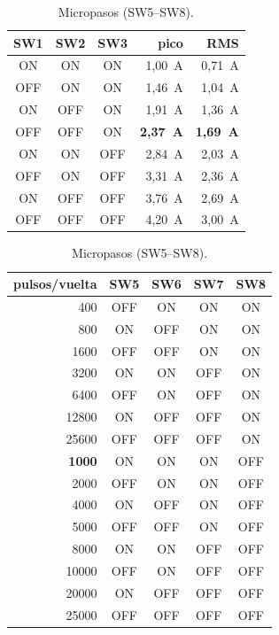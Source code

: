 \begin{table}[H]
\centering\small
\begin{minipage}[t]{0.47\linewidth}\centering
\begin{tabular}{@{}cccrr@{}}
\toprule
\textbf{SW1} & \textbf{SW2} & \textbf{SW3} & \textbf{pico} & \textbf{RMS}\\
\midrule
ON & ON & ON & 1,00~A & 0,71~A\\
OFF & ON & ON & 1,46~A & 1,04~A\\
ON & OFF & ON & 1,91~A & 1,36~A\\
\rowcolor{naranja!20} OFF & OFF & ON & \textbf{2,37~A} & \textbf{1,69~A}\\
ON & ON & OFF & 2,84~A & 2,03~A\\
OFF & ON & OFF & 3,31~A & 2,36~A\\
ON & OFF & OFF & 3,76~A & 2,69~A\\
OFF & OFF & OFF & 4,20~A & 3,00~A\\
\bottomrule
\end{tabular}
\caption{Corriente de trabajo (SW1--SW3).}
\end{minipage}\hfill
\begin{minipage}[t]{0.5\linewidth}\centering
\begin{tabular}{@{}rcccc@{}}
\toprule
\textbf{pulsos/vuelta} & \textbf{SW5} & \textbf{SW6} & \textbf{SW7} & \textbf{SW8}\\
\midrule
400 & OFF & ON & ON & ON\\
800 & ON & OFF & ON & ON\\
1600 & OFF & OFF & ON & ON\\
3200 & ON & ON & OFF & ON\\
6400 & OFF & ON & OFF & ON\\
12800 & ON & OFF & OFF & ON\\
25600 & OFF & OFF & OFF & ON\\
\rowcolor{naranja!20} \textbf{1000} & ON & ON & ON & OFF\\
2000 & OFF & ON & ON & OFF\\
4000 & ON & OFF & ON & OFF\\
5000 & OFF & OFF & ON & OFF\\
8000 & ON & ON & OFF & OFF\\
10000 & OFF & ON & OFF & OFF\\
20000 & ON & OFF & OFF & OFF\\
25000 & OFF & OFF & OFF & OFF\\
\bottomrule
\end{tabular}
\caption{Micropasos (SW5--SW8).}
\end{minipage}
\end{table}

